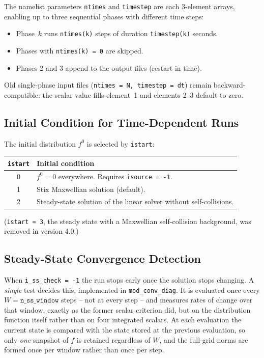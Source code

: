 \documentclass[11pt,a4paper]{article}
\begin{document}
The namelist parameters \texttt{ntimes} and \texttt{timestep} are each
3-element arrays, enabling up to three sequential phases with different time
steps:
\begin{itemize}
  \item Phase~$k$ runs \texttt{ntimes(k)} steps of duration \texttt{timestep(k)} seconds.
  \item Phases with \texttt{ntimes(k) = 0} are skipped.
  \item Phases 2 and 3 append to the output files (restart in time).
\end{itemize}
Old single-phase input files (\texttt{ntimes = N, timestep = dt}) remain
backward-compatible: the scalar value fills element~1 and elements 2--3
default to zero.

\subsection{Initial Condition for Time-Dependent Runs}

The initial distribution $f^0$ is selected by \texttt{istart}:

\begin{center}
\begin{tabular}{cl}
\toprule
\texttt{istart} & Initial condition \\
\midrule
0 & $f^0 = 0$ everywhere. Requires \texttt{isource = -1}. \\
1 & Stix Maxwellian solution (default). \\
2 & Steady-state solution of the linear solver without self-collisions. \\
\bottomrule
\end{tabular}
\end{center}
(\texttt{istart = 3}, the steady state with a Maxwellian self-collision background, was removed in
version 4.0.)

\subsection{Steady-State Convergence Detection}
\label{sec:ssconv}

When \texttt{i\_ss\_check = -1} the run stops early once the solution stops
changing.  A \emph{single} test decides this, implemented in
\texttt{mod\_conv\_diag}.  It is evaluated once every $W =
\texttt{n\_ss\_window}$ steps -- not at every step -- and measures rates of
change over that window, exactly as the former scalar criterion did, but on the
distribution function itself rather than on four integrated scalars.  At each
evaluation the current state is compared with the state stored at the previous
evaluation, so only \emph{one} snapshot of $f$ is retained regardless of $W$,
and the full-grid norms are formed once per window rather than once per step.
\end{document}
